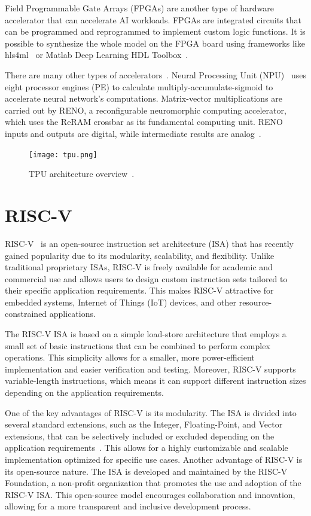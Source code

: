 Field Programmable Gate Arrays (FPGAs) are another type of hardware accelerator that can accelerate AI workloads. FPGAs are integrated circuits that can be programmed and reprogrammed to implement custom logic functions. It is possible to synthesize the whole model on the FPGA board using frameworks like hls4ml~\cite{hls4ml} or Matlab Deep Learning HDL Toolbox~\cite{matbal_dl_hdl_documentation}.

There are many other types of accelerators~\cite{accelerators}. Neural Processing Unit (NPU)~\cite{npu} uses eight processor engines (PE) to calculate multiply-accumulate-sigmoid to accelerate neural network's computations. Matrix-vector multiplications are carried out by RENO, a reconfigurable neuromorphic computing accelerator, which uses the ReRAM crossbar as its fundamental computing unit. RENO inputs and outputs are digital, while intermediate results are analog~\cite{reno}.

\begin{figure}[htb]
\centering
\caption{TPU architecture overview~\cite{tpu}.}
\texttt{[image: tpu.png]}
\label{fig:tpu}
\end{figure}

\section{RISC-V}

RISC-V~\cite{risc_v_manual} is an open-source instruction set architecture (ISA) that has recently gained popularity due to its modularity, scalability, and flexibility. Unlike traditional proprietary ISAs, RISC-V is freely available for academic and commercial use and allows users to design custom instruction sets tailored to their specific application requirements. This makes RISC-V attractive for embedded systems, Internet of Things (IoT) devices, and other resource-constrained applications.

The RISC-V ISA is based on a simple load-store architecture that employs a small set of basic instructions that can be combined to perform complex operations. This simplicity allows for a smaller, more power-efficient implementation and easier verification and testing. Moreover, RISC-V supports variable-length instructions, which means it can support different instruction sizes depending on the application requirements.

One of the key advantages of RISC-V is its modularity. The ISA is divided into several standard extensions, such as the Integer, Floating-Point, and Vector extensions, that can be selectively included or excluded depending on the application requirements~\cite {risc_v_manual}. This allows for a highly customizable and scalable implementation optimized for specific use cases. Another advantage of RISC-V is its open-source nature. The ISA is developed and maintained by the RISC-V Foundation, a non-profit organization that promotes the use and adoption of the RISC-V ISA. This open-source model encourages collaboration and innovation, allowing for a more transparent and inclusive development process.


